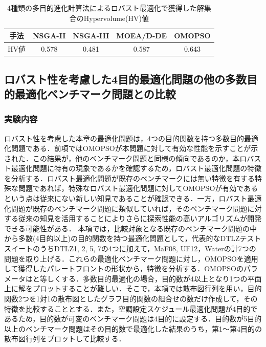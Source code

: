 \begin{table}[t]
    \begin{center}
        \caption{4種類の多目的進化計算法によるロバスト最適化で獲得した解集合のHypervolume(HV)値}
        \label{tab::robust_result_hv_multi}
        \small
        \begin{tabular}{c|c|c|c|c}
            \hline
            手法 & NSGA-II & NSGA-III & MOEA/D-DE & OMOPSO \\
            \hline \hline
            HV値 & 0.578   & 0.481    & 0.587     & 0.643  \\
            \hline
        \end{tabular}
    \end{center}
\end{table}


\subsection{ロバスト性を考慮した4目的最適化問題の他の多数目的最適化ベンチマーク問題との比較}
\subsubsection{実験内容}
ロバスト性を考慮した本章の最適化問題は，4つの目的関数を持つ多数目的最適化問題である．前項ではOMOPSOが本問題に対して有効な性能を示すことが示された．この結果が，他のベンチマーク問題と同様の傾向であるのか，本ロバスト最適化問題に特有の現象であるかを確認するため，ロバスト最適化問題の特徴を分析する．ロバスト最適化問題が既存のベンチマークには無い特徴を有する特殊な問題であれば，特殊なロバスト最適化問題に対してOMOPSOが有効であるという点は従来にない新しい知見であることが確認できる．一方，ロバスト最適化問題が既存のベンチマーク問題に類似していれば，そのベンチマーク問題に対する従来の知見を活用することによりさらに探索性能の高いアルゴリズムが開発できる可能性がある．
本項では，比較対象となる既存のベンチマーク問題の中から多数(4目的以上)の目的関数を持つ最適化問題として，代表的なDTLZテストスイート\cite{Deb05}のうちDTLZ1, 2, 5, 7の4つに加えて，MaF08\cite{Cheng17}, UF12\cite{Zhang08}，Water\cite{Ray01}の計7つの問題を取り上げる．これらの最適化ベンチマーク問題に対し，OMOPSOを適用して獲得したパレートフロントの形状から，特徴を分析する．OMOPSOのパラメータはと等しくする．多数目的最適化の場合，目的数が4以上となり1つの平面上に解をプロットすることが難しい．そこで，本項では散布図行列を用い，目的関数2つを1対1の散布図としたグラフ目的関数の組合せの数だけ作成して，その特徴を比較することとする．また，空調設定スケジュール最適化問題が4目的であるため，目的数が可変のベンチマーク問題は4目的に設定する．目的数が5目的以上のベンチマーク問題はその目的数で最適化した結果のうち，第1～第4目的の散布図行列をプロットして比較する．

